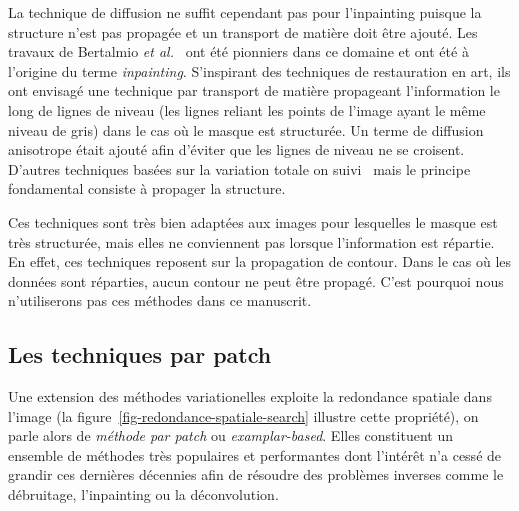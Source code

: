 La technique de diffusion ne suffit cependant pas pour l'inpainting puisque la structure n'est pas propagée et un transport de matière doit être ajouté. Les travaux de Bertalmio \textit{et al.}~\cite{bertalmio2000image} ont été pionniers dans ce domaine et ont été à l'origine du terme \emph{inpainting}. S'inspirant des techniques de restauration en art, ils ont envisagé une technique par transport de matière propageant l'information le long de lignes de niveau (les lignes reliant les points de l'image ayant le même niveau de gris) dans le cas où le masque est structurée. Un terme de diffusion anisotrope était ajouté afin d'éviter que les lignes de niveau ne se croisent. D'autres techniques basées sur la variation totale on suivi~\cite{shen2002mathematical, chan2001nontexture} mais le principe fondamental consiste à propager la structure.

Ces techniques sont très bien adaptées aux images pour lesquelles le masque est très structurée, mais elles ne conviennent pas lorsque l'information est répartie. En effet, ces techniques reposent sur la propagation de contour. Dans le cas où les données sont réparties, aucun contour ne peut être propagé. C'est pourquoi nous n'utiliserons pas ces méthodes dans ce manuscrit.


\subsection{Les techniques par patch}\label{sec-art-patch}

Une extension des méthodes variationelles exploite la redondance spatiale dans l'image (la figure~\ref{fig-redondance-spatiale-search} illustre cette propriété), on parle alors de \emph{méthode par patch} ou \emph{examplar-based}. Elles constituent un ensemble de méthodes très populaires et performantes dont l'intérêt n'a cessé de grandir ces dernières décennies afin de résoudre des problèmes inverses comme le débruitage, l'inpainting ou la déconvolution.

